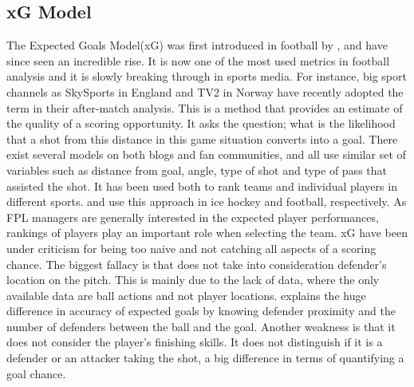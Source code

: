 \subsection{xG Model}\label{xG_model}
The Expected Goals Model(xG) was first introduced in football by \cite{samgreen}, and have since seen an incredible rise. It is now one of the most used metrics in football analysis and it is slowly breaking through in sports media. For instance, big sport channels as SkySports\citep{skysports} in England and TV2\citep{tv2} in Norway have recently adopted the term in their after-match analysis.  
\newpar
This is a method that provides an estimate of the quality of a scoring opportunity. It asks the question; what is the likelihood that a shot from this distance in this game situation converts into a goal. There exist several models on both blogs and fan communities, and all use similar set of variables such as distance from goal, angle, type of shot and type of pass that assisted the shot. It has been used both to rank teams and individual players in different sports. \cite{macdonald} and \cite{vabo} use this approach in ice hockey and football, respectively. As FPL managers are generally interested in the expected player performances, rankings of players play an important role when selecting the team. 
\newpar 
xG have been under criticism for being too naive and not catching all aspects of a scoring chance\citep{michaelcaley1}. The biggest fallacy is that does not take into consideration defender's location on the pitch. This is mainly due to the lack of data, where the only available data are ball actions and not player locations. \cite{lucey} explains the huge difference in accuracy of expected goals by knowing defender proximity and the number of defenders between the ball and the goal. Another weakness is that it does not consider the player's finishing skills. It does not distinguish if it is a defender or an attacker taking the shot, a big difference in terms of quantifying a goal chance. 



